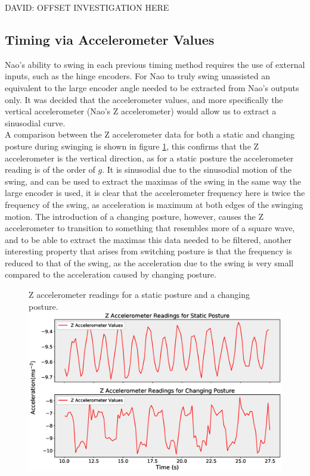 \documentclass[11pt]{article}
\newcommand*\ruleline[1]{\par\noindent\raisebox{.8ex}{\makebox[\linewidth]{\hrulefill\hspace{1ex}\raisebox{-.8ex}{#1}\hspace{1ex}\hrulefill}}}
\begin{document}
DAVID: OFFSET INVESTIGATION HERE

\subsection{Timing via Accelerometer Values}
\ruleline{George Sheppard}
Nao's ability to swing in each previous timing method requires the use of external inputs, such as the hinge encoders. For Nao to truly swing unassisted an equivalent to the large encoder angle needed to be extracted from Nao's outputs only. It was decided that the accelerometer values, and more specifically the vertical accelerometer (Nao's Z accelerometer) would allow us to extract a sinusodial curve.\\

A comparison between the Z accelerometer data for both a static and changing posture during swinging is shown in figure \ref{fig:AccelerometerComparison}, this confirms that the Z accelerometer is the vertical direction, as for a static posture the accelerometer reading is of the order of $g$. It is sinusodial due to the sinusodial motion of the swing, and can be used to extract the maximas of the swing in the same way the large encoder is used, it is clear that the accelerometer frequency here is twice the frequency of the swing, as acceleration is maximum at both edges of the swinging motion. The introduction of a changing posture, however, causes the Z accelerometer to transition to something that resembles more of a square wave, and to be able to extract the maximas this data needed to be filtered, another interesting property that arises from switching posture is that the frequency is reduced to that of the swing, as the acceleration due to the swing is very small compared to the acceleration caused by changing posture.\\

    \begin{figure}[!htb]
        \centering
        \captionbox
             {Z accelerometer readings for a static posture and a changing posture.\label{fig:AccelerometerComparison}}
             {\includegraphics[width=1.0\textwidth]{AccelerometerComparison.eps}}
    \end{figure}
\end{document}
